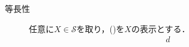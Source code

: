 \begin{prf}
\begin{description}
\begin{description}
				\end{description}
			\item[等長性]
				任意に$X \in \mathcal{S}$を取り，()を$X$の表示とする．
				\begin{align}
					d
				\end{align}
		\end{description}
	\end{prf}